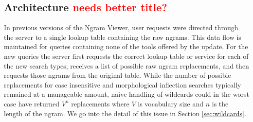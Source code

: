\documentclass[11pt]{article}
\begin{document}
\subsection{Architecture \textcolor{red}{needs better title?}}
	In previous versions of the Ngram Viewer, user requests were directed through the server to a single lookup table containing the raw ngrams. This data flow is maintained for queries containing none of the tools offered by the update. For the new queries the server first requests the correct lookup table or service for each of the new search types, receives a list of possible raw ngram replacements, and then requests those ngrams from the original table. While the number of possible replacements for case insensitive and morphological inflection searches typically remained at a manageable amount, na\"\i ve handling of wildcards could in the worst case have returned $V^n$ replacements where $V$ is vocabulary size and $n$ is the length of the ngram. We go into the detail of this issue in Section \ref{sec:wildcards}.
\end{document}
